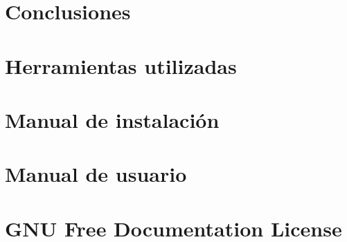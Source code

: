\documentclass[a4paper,12pt]{scrbook}
\begin{document}
\chapter{Conclusiones}
\label{chap:conclusiones}
%

\appendix

\chapter{Herramientas utilizadas}
\label{chap:herramientas}
%

\chapter{Manual de instalación}
\label{chap:manual_instalacion}
%

\chapter{Manual de usuario}
\label{chap:manual_usuario}
%

\chapter{GNU Free Documentation License}
\label{sec:fdl}
%



\end{document}
